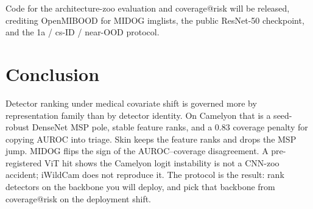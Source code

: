 \documentclass[10pt,twocolumn,letterpaper]{article}
\begin{document}
Code for the architecture-zoo evaluation and coverage@risk will be released, crediting OpenMIBOOD for MIDOG imglists, the public ResNet-50 checkpoint, and the 1a / cs-ID / near-OOD protocol.

\section{Conclusion}

Detector ranking under medical covariate shift is governed more by representation family than by detector identity.
On Camelyon that is a seed-robust DenseNet MSP pole, stable feature ranks, and a $0.83$ coverage penalty for copying AUROC into triage.
Skin keeps the feature ranks and drops the MSP jump.
MIDOG flips the sign of the AUROC--coverage disagreement.
A pre-registered ViT hit shows the Camelyon logit instability is not a CNN-zoo accident; iWildCam does not reproduce it.
The protocol is the result: rank detectors on the backbone you will deploy, and pick that backbone from coverage@risk on the deployment shift.

{\small


}
\end{document}
